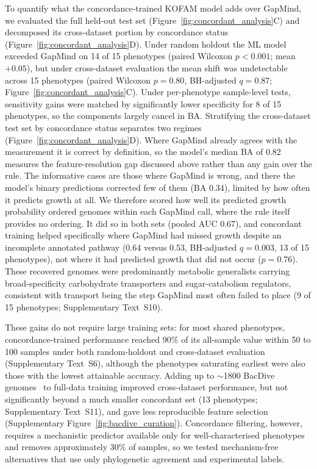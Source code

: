 To quantify what the concordance-trained KOFAM model adds over GapMind, we evaluated the full held-out test set (Figure~\ref{fig:concordant_analysis}C) and decomposed its cross-dataset portion by concordance status (Figure~\ref{fig:concordant_analysis}D).
Under random holdout the ML model exceeded GapMind on 14 of 15 phenotypes (paired Wilcoxon $p < 0.001$; mean $+0.05$), but under cross-dataset evaluation the mean shift was undetectable across 15 phenotypes (paired Wilcoxon $p = 0.80$, BH-adjusted $q = 0.87$; Figure~\ref{fig:concordant_analysis}C).
Under per-phenotype sample-level tests, sensitivity gains were matched by significantly lower specificity for 8 of 15 phenotypes, so the components largely cancel in BA.
Stratifying the cross-dataset test set by concordance status separates two regimes (Figure~\ref{fig:concordant_analysis}D).
Where GapMind already agrees with the measurement it is correct by definition, so the model's median BA of 0.82 measures the feature-resolution gap discussed above rather than any gain over the rule.
The informative cases are those where GapMind is wrong, and there the model's binary predictions corrected few of them (BA 0.34), limited by how often it predicts growth at all.
We therefore scored how well its predicted growth probability ordered genomes within each GapMind call, where the rule itself provides no ordering.
It did so in both sets (pooled AUC 0.67), and concordant training helped specifically where GapMind had missed growth despite an incomplete annotated pathway (0.64 versus 0.53, BH-adjusted $q = 0.003$, 13 of 15 phenotypes), not where it had predicted growth that did not occur ($p = 0.76$).
These recovered genomes were predominantly metabolic generalists carrying broad-specificity carbohydrate transporters and sugar-catabolism regulators, consistent with transport being the step GapMind most often failed to place (9 of 15 phenotypes; Supplementary Text~S10).

These gains do not require large training sets: for most shared phenotypes, concordance-trained performance reached 90\% of its all-sample value within 50 to 100 samples under both random-holdout and cross-dataset evaluation (Supplementary Text~S6), although the phenotypes saturating earliest were also those with the lowest attainable accuracy.
Adding up to $\sim$1800 BacDive genomes~\cite{Schober2025BacDive} to full-data training improved cross-dataset performance, but not significantly beyond a much smaller concordant set (13 phenotypes; Supplementary Text~S11), and gave less reproducible feature selection (Supplementary Figure~\ref{fig:bacdive_curation}).
Concordance filtering, however, requires a mechanistic predictor available only for well-characterised phenotypes and removes approximately 30\% of samples, so we tested mechanism-free alternatives that use only phylogenetic agreement and experimental labels.


